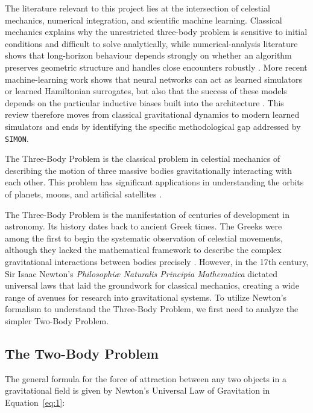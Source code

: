 \documentclass[12pt]{article}
\begin{document}
The literature relevant to this project lies at the intersection of celestial mechanics, numerical integration, and scientific machine learning. Classical mechanics explains why the unrestricted three-body problem is sensitive to initial conditions and difficult to solve analytically, while numerical-analysis literature shows that long-horizon behaviour depends strongly on whether an algorithm preserves geometric structure and handles close encounters robustly \cite{hairer2006geometric,Rein_2015,Rein_2014,boekholt2015reliability}. More recent machine-learning work shows that neural networks can act as learned simulators or learned Hamiltonian surrogates, but also that the success of these models depends on the particular inductive biases built into the architecture \cite{chen2018neuralode,battaglia2016interaction,greydanus2019hamiltonian,gruver2022deconstructing,horn2025generalized}. This review therefore moves from classical gravitational dynamics to modern learned simulators and ends by identifying the specific methodological gap addressed by \texttt{SIMON}.


The Three-Body Problem is the classical problem in celestial
mechanics of describing the motion of three massive bodies
gravitationally interacting with each other. This problem has
significant applications in understanding the orbits of planets,
moons, and artificial satellites \citep{gardner2006james}.

The Three-Body Problem is the manifestation of centuries
of development in astronomy. Its history dates back to ancient
Greek times. The Greeks were among the first to begin the
systematic observation of celestial movements, although they
lacked the mathematical framework to describe the complex
gravitational interactions between bodies precisely \citep{anjum2020timelinegravity}. However, in the 17th century, Sir Isaac Newton's
\textit{Philosophiæ Naturalis Principia Mathematica} \citep{newton1687principia, cohen1999principia} dictated universal laws that laid
the groundwork for classical mechanics, creating a wide range
of avenues for research into gravitational systems. To utilize
Newton's formalism to understand the Three-Body Problem,
we first need to analyze the simpler Two-Body Problem.

\subsection{The Two-Body Problem}
\label{subsec:2bp}
The general formula for the force of attraction between any two objects in a gravitational field is given by Newton's Universal Law of Gravitation in Equation~\ref{eq:1}:
\end{document}
